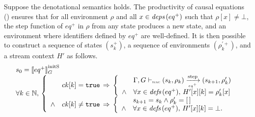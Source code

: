 \begin{skippableproof}
    Suppose the denotational semantics  holds.
    The productivity of causal equations ()
    ensures that for all environment $\rho$ and all $x \in {\ensuremath{\textit{deps}\left(eq^+\right)}}$ such that
    $\rho[x] \neq \bot$, the step function of $eq^+$ in $\rho$ from any state produces a new state,
    and an environment where identifiers defined by $eq^+$ are well-defined.
    It is then possible to construct a sequence of states $(s_k^+)$, a sequence of environments
    $(\rho_k^{\prime+})$, and a stream context $H'$ as follows.
    \begin{equation*}
        \begin{array}{l}
            s_0 = \initstate{eq^+} \\
            \forall k \in \N, \,
            \left\{
            \begin{array}{ll}
                       & ck[k] = \true \, \Rightarrow \,
                \left\{
                \begin{array}{ll}
                           & \eqOpsem{\rho_k}{s_k}{eq^+}{s_{k+1}}{\rho'_k}       \\
                    \wedge & \forall x \in \defs{eq^+}, \, H'[x][k] = \rho'_k[x] \\
                \end{array}
                \right.                                     \\
                \wedge & ck[k] \neq \true \, \Rightarrow \,
                \left\{
                \begin{array}{ll}
                           & s_{k+1} = s_k \wedge \rho'_k = \emptyrho       \\
                    \wedge & \forall x \in \defs{eq^+}, \, H'[x][k] = \bot. \\
                \end{array}
                \right.                                     \\
            \end{array}
            \right.
        \end{array}
    \end{equation*}


\end{skippableproof}
